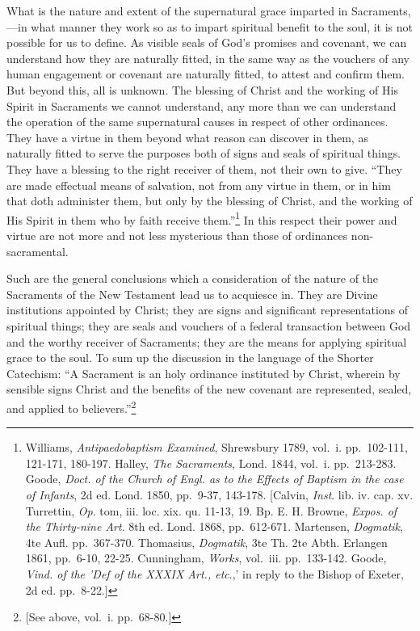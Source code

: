 \documentclass[]{book}
\begin{document}
What is the nature and extent of the supernatural grace imparted in Sacraments,---in what manner they work so as to impart spiritual benefit to the soul, it is not possible for us to define. As visible seals of God's promises and covenant, we can understand how they are naturally fitted, in the same way as the vouchers of any human engagement or covenant are naturally fitted, to attest and confirm them. But beyond this, all is unknown. The blessing of Christ and the working of His Spirit in Sacraments we cannot understand, any more than we can understand the operation of the same supernatural causes in respect of other ordinances. They have a virtue in them beyond what reason can discover in them, as naturally fitted to serve the purposes both of signs and seals of spiritual things. They have a blessing to the right receiver of them, not their own to give. ``They are made effectual means of salvation, not from any virtue in them, or in him that doth administer them, but only by the blessing of Christ, and the working of His Spirit in them who by faith receive them.''\footnote{Williams, \emph{Antipaedobaptism Examined}, Shrewsbury 1789, vol.~i. pp.~102-111, 121-171, 180-197. Halley, \emph{The Sacraments}, Lond. 1844, vol.~i. pp.~213-283. Goode, \emph{Doct. of the Church of Engl. as to the Effects of Baptism in the case of Infants}, 2d ed. Lond. 1850, pp.~9-37, 143-178. {[}Calvin, \emph{Inst}. lib. iv. cap. xv. Turrettin, \emph{Op}. tom, iii. loc. xix. qu. 11-13, 19. Bp. E. H. Browne, \emph{Expos. of the Thirty-nine Art}. 8th ed. Lond. 1868, pp.~612-671. Martensen, \emph{Dogmatik}, 4te Aufl. pp.~367-370. Thomasius, \emph{Dogmatik}, 3te Th. 2te Abth. Erlangen 1861, pp.~6-10, 22-25. Cunningham, \emph{Works}, vol.~iii. pp.~133-142. Goode, \emph{Vind. of the 'Def of the XXXIX Art., etc}.,' in reply to the Bishop of Exeter, 2d ed. pp.~8-22.{]}} In this respect their power and virtue are not more and not less mysterious than those of ordinances non-sacramental.

Such are the general conclusions which a consideration of the nature of the Sacraments of the New Testament lead us to acquiesce in. They are Divine institutions appointed by Christ; they are signs and significant representations of spiritual things; they are seals and vouchers of a federal transaction between God and the worthy receiver of Sacraments; they are the means for applying spiritual grace to the soul. To sum up the discussion in the language of the Shorter Catechism: ``A Sacrament is an holy ordinance instituted by Christ, wherein by sensible signs Christ and the benefits of the new covenant are represented, sealed, and applied to believers.''\footnote{{[}See above, vol.~i. pp.~68-80.{]}}
\end{document}
